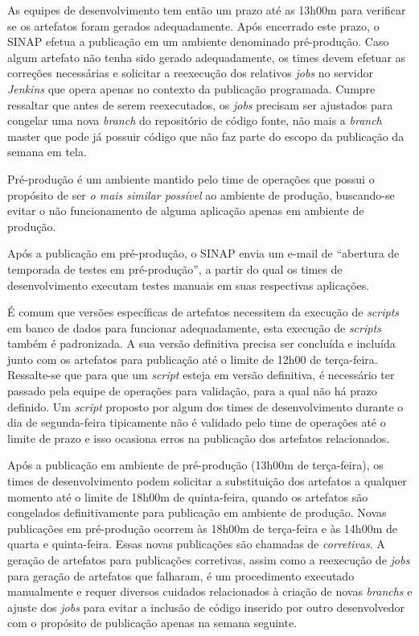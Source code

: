 As equipes de desenvolvimento tem então um prazo até
as 13h00m para verificar se os artefatos foram gerados adequadamente. Após
encerrado este prazo, o \acrshort{SINAP} efetua a publicação
em um ambiente denominado pré-produção. Caso algum artefato não tenha sido
gerado adequadamente, os times devem efetuar as correções necessárias e
solicitar a reexecução dos relativos \textit{jobs} no servidor \textit{Jenkins}
que opera apenas no contexto da publicação programada. Cumpre ressaltar que
antes de serem reexecutados, os \textit{jobs} precisam ser ajustados para
congelar uma nova \textit{branch} do repositório de código fonte, não mais a
\textit{branch} master que pode já possuir código que não faz parte do escopo
da publicação da semana em tela.

Pré-produção é um ambiente mantido pelo time de operações que possui o
propósito de ser \emph{o mais similar possível} ao ambiente de produção,
buscando-se evitar o não funcionamento de alguma aplicação apenas em ambiente
de produção.

Após a publicação em pré-produção, o \acrshort{SINAP} envia um e-mail de
``abertura de temporada de testes em pré-produção'', a partir do qual os times
de desenvolvimento executam testes manuais em suas respectivas aplicações.

É comum que versões específicas de artefatos necessitem da execução de
\textit{scripts} em banco de dados para funcionar adequadamente, esta execução
de \textit{scripts} também é padronizada. A sua versão definitiva
precisa ser concluída e incluída junto com os artefatos para publicação até o
limite de 12h00 de terça-feira. Ressalte-se que para que um \textit{script}
esteja em versão definitiva, é necessário ter passado pela equipe de operações
para validação, para a qual não há prazo definido. Um \textit{script}
proposto por algum dos times de desenvolvimento durante o dia de segunda-feira
tipicamente não é validado pelo time de operações até o limite de prazo e isso
ocasiona erros na publicação dos artefatos relacionados.

Após a publicação em ambiente de pré-produção (13h00m de terça-feira), os times
de desenvolvimento podem solicitar a substituição dos artefatos a qualquer
momento até o limite de 18h00m de quinta-feira, quando os artefatos são
congelados definitivamente para publicação em ambiente de produção. Novas
publicações em pré-produção ocorrem às 18h00m de terça-feira e às 14h00m de
quarta e quinta-feira. Essas novas publicações são chamadas de \emph{corretivas}.
A geração de artefatos para publicações corretivas, assim como a reexecução
de \textit{jobs} para geração de artefatos que falharam, é um procedimento
executado manualmente e requer diversos cuidados relacionados à criação de novas
\textit{branchs} e ajuste dos \textit{jobs} para evitar a inclusão de código
inserido por outro desenvolvedor com o propósito de publicação apenas na semana
seguinte.

